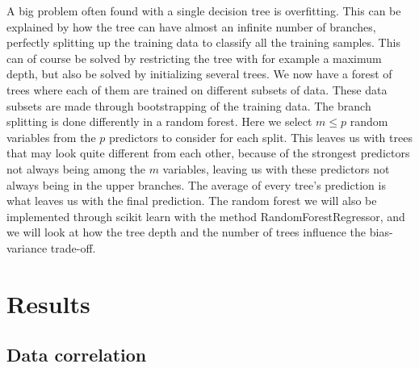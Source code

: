 \documentclass[11pt]{article}
\begin{document}
A big problem often found with a single decision tree is overfitting. This can be explained by how the tree can have almost an infinite number of branches, perfectly splitting up the training data to classify all the training samples. This can of course be solved by restricting the tree with for example a maximum depth, but also be solved by initializing several trees. We now have a forest of trees where each of them are trained on different subsets of data. These data subsets are made through bootstrapping of the training data. The branch splitting is done differently in a random forest. Here we select $m \leq p$ random variables from the $p$ predictors to consider for each split. This leaves us with trees that may look quite different from each other, because of the strongest predictors not always being among the $m$ variables, leaving us with these predictors not always being in the upper branches. The average of every tree's prediction is what leaves us with the final prediction. The random forest we will also be implemented through scikit learn with the method RandomForestRegressor, and we will look at how the tree depth and the number of trees influence the bias-variance trade-off.




\section{Results}
\subsection{Data correlation} %
\label{sub:Data correlation}
\end{document}
